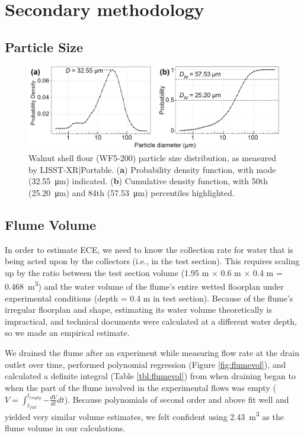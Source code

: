 \documentclass[geosciences,article,submit,moreauthors,pdftex]{Definitions/mdpi}
\begin{document}
\appendix
\section{Secondary methodology}
\unskip
\subsection{Particle Size}
\begin{figure}[H]
\centering
\includegraphics[width=5in]{../pics/wf5-200sizedist.png}
\caption{Walnut shell flour (WF5-200) particle size distribution, as measured by LISST-XR|Portable. (\textbf{a}) Probability density function, with mode (\SI{32.55}{\micro\metre}) indicated. (\textbf{b}) Cumulative density function, with 50th (\SI{25.20}{\micro\metre}) and 84th (\SI{57.53}{\micro\metre}) percentiles highlighted.}
\end{figure}

\subsection{Flume Volume}

In order to estimate ECE, we need to know the collection rate for water that is being acted upon by the collectors (i.e., in the test section). This requires scaling up by the ratio between the test section volume (1.95 m $\times$ 0.6 m $\times$ 0.4 m = \SI{0.468}{m^3}) and the water volume of the flume's entire wetted floorplan under experimental conditions (depth = 0.4 m in test section). Because of the flume's irregular floorplan and shape, estimating its water volume theoretically is impractical, and technical documents were calculated at a different water depth, so we made an empirical estimate. 

We drained the flume after an experiment while measuring flow rate at the drain outlet over time, performed polynomial regression (Figure \ref{fig:flumevol}), and calculated a definite integral (Table \ref{tbl:flumevol}) from when draining began to when the part of the flume involved in the experimental flows was empty ($V = \int_{t_{full}}^{t_{empty}}{-\frac{dV}{dt}dt}$). Because polynomials of second order and above fit well and yielded very similar volume estimates, we felt confident using \SI{2.43}{\metre\cubed} as the flume volume in our calculations.
\end{document}
